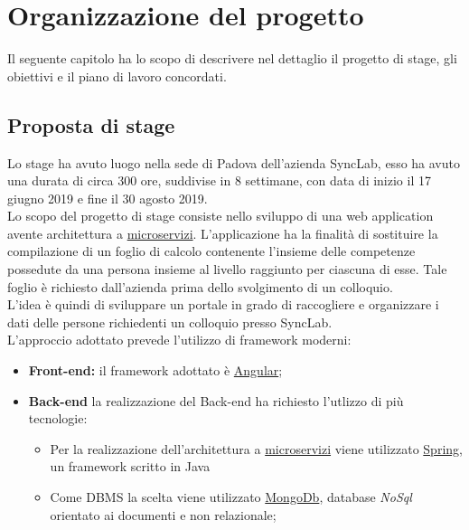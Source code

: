 
\chapter{Organizzazione del progetto}
\label{cap:organizzazione-del-progetto}
Il seguente capitolo ha lo scopo di descrivere nel dettaglio il progetto di stage, gli obiettivi e il piano di lavoro concordati.

\section{Proposta di stage}
Lo stage ha avuto luogo nella sede di Padova dell'azienda SyncLab, esso ha avuto una durata di circa 300 ore, suddivise in 8 settimane, con data di inizio il 17 giugno 2019 e fine il 30 agosto 2019. \\
Lo scopo del progetto di stage consiste nello sviluppo di una \gls{web application} avente architettura a \hyperref[micro]{microservizi}.
L'applicazione ha la finalità di sostituire la compilazione di un foglio di calcolo contenente l'insieme delle competenze possedute da una persona insieme al livello raggiunto per ciascuna di esse. Tale foglio è richiesto dall'azienda prima dello svolgimento di un colloquio.\\
L'idea è quindi di sviluppare un portale in grado di raccogliere e organizzare i dati delle persone richiedenti un colloquio presso SyncLab.\\
L'approccio adottato prevede l'utilizzo di \gls{framework} moderni:

\begin{itemize}
	\item \textbf{Front-end:} il \gls{framework} adottato è \hyperref[angular]{Angular};
	\item \textbf{Back-end} la realizzazione del Back-end ha richiesto l'utlizzo di più tecnologie:
	\begin{itemize}
		\item Per la realizzazione dell'architettura a \hyperref[micro]{microservizi} viene utilizzato \hyperref[tech-spring]{Spring}, un \gls{framework} scritto in \gls{Java}
		\item Come \gls{DBMS} la scelta viene utilizzato \hyperref[mongodb]{MongoDb}, database \textit{NoSql} orientato ai documenti e non relazionale;
	\end{itemize}
\end{itemize}


